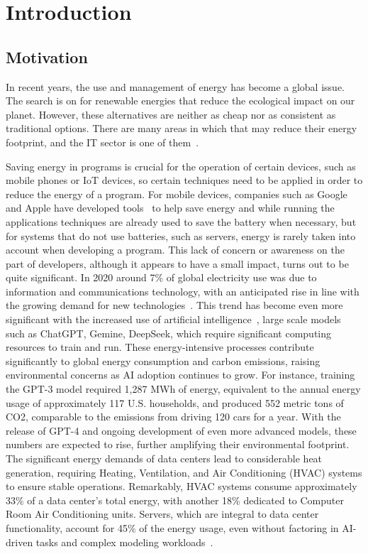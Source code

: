 


\chapter{Introduction}

\section{Motivation}

In recent years, the use and management of energy has become a global issue. The search is on for renewable energies that reduce the ecological impact on our planet. However, these alternatives are neither as cheap nor as consistent as traditional options. There are many areas in which that may reduce their energy footprint, and the IT sector is one of them~\cite{annurev:/content/journals/10.1146/annurev.resource.102308.124234,10.1145/1666420.1666438}.

Saving energy in programs is crucial for the operation of certain devices, such as mobile phones or IoT devices, so certain techniques need to be applied in order to reduce the energy of a program. For mobile devices, companies such as Google and Apple have developed tools~\cite{google_adaptive_battery,google_battery_saver,apple_clean_energy, android_power_profiler} to help save energy and while running the applications techniques are already used to save the battery when necessary, but for systems that do not use batteries, such as servers, energy is rarely taken into account when developing a program. This lack of concern or awareness on the part of developers, although it appears to have a small impact, turns out to be quite significant. In 2020 around 7\% of global electricity use was due to information and communications technology, with an anticipated rise in line with the growing demand for new technologies~\cite{article}. This trend has become even more significant with the increased use of artificial intelligence~\cite{patterson2021carbon}, large scale models such as ChatGPT, Gemine, DeepSeek, which require significant computing resources to train and run. These energy-intensive processes contribute significantly to global energy consumption and carbon emissions, raising environmental concerns as AI adoption continues to grow. For instance, training the GPT-3 model required 1,287 MWh of energy, equivalent to the annual energy usage of approximately 117 U.S. households, and produced 552 metric tons of CO2, comparable to the emissions from driving 120 cars for a year. With the release of GPT-4 and ongoing development of even more advanced models, these numbers are expected to rise, further amplifying their environmental footprint. The significant energy demands of data centers lead to considerable heat generation, requiring Heating, Ventilation, and Air Conditioning (HVAC) systems to ensure stable operations. Remarkably, HVAC systems consume approximately 33\% of a data center's total energy, with another 18\% dedicated to Computer Room Air Conditioning units. Servers, which are integral to data center functionality, account for 45\% of the energy usage, even without factoring in AI-driven tasks and complex modeling workloads~\cite{balaras2017high}.

